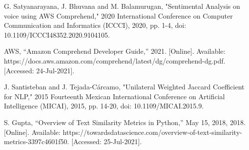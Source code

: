 \documentclass[conference]{style/IEEEtran}
\begin{document}
\begin{thebibliography}{00}
 G. Satyanarayana, J. Bhuvana and M. Balamurugan, "Sentimental Analysis on voice using AWS Comprehend," 2020 International Conference on Computer Communication and Informatics (ICCCI), 2020, pp. 1-4, doi: 10.1109/ICCCI48352.2020.9104105.

 AWS, “Amazon Comprehend Developer Guide,” 2021. [Online]. Available: https://docs.aws.amazon.com/comprehend/latest/dg/comprehend-dg.pdf. [Accessed: 24-Jul-2021].

 J. Santisteban and J. Tejada-Cárcamo, "Unilateral Weighted Jaccard Coefficient for NLP," 2015 Fourteenth Mexican International Conference on Artificial Intelligence (MICAI), 2015, pp. 14-20, doi: 10.1109/MICAI.2015.9.

 S. Gupta, “Overview of Text Similarity Metrics in Python,” May 15, 2018, 2018. [Online]. Available: https://towardsdatascience.com/overview-of-text-similarity-metrics-3397c4601f50. [Accessed: 25-Jul-2021].

\end{thebibliography}

\vspace{12pt}
\end{document}
